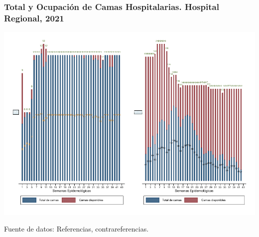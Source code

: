 \documentclass[xcolor=table]{beamer}
\begin{document}
	\begin{frame}
		\frametitle{Total y Ocupación de Camas Hospitalarias. Hospital Regional, 2021}
		\vspace{-.2cm}
		\begin{center}
			\includegraphics[width=0.9\linewidth, trim={0cm .5cm 0cm 0.2cm},clip]{../figuras/h_regional}
			
			\begin{table}[]
			\end{table}
			
		\end{center}
		{\tiny Fuente de datos: Referencias, contrareferencias.}
	\end{frame}
	
\end{document}
